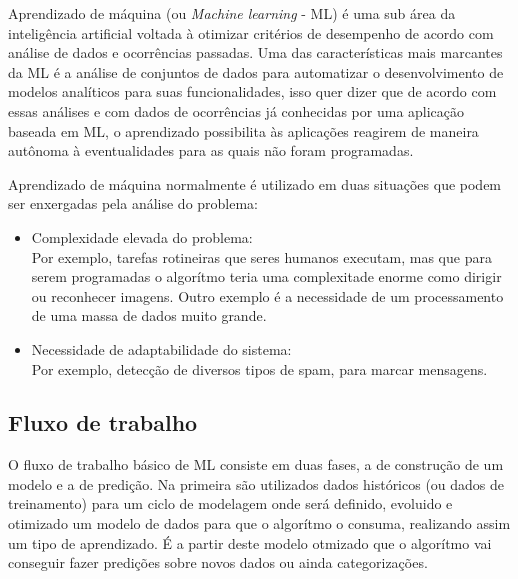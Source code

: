Aprendizado de máquina (ou \textit{Machine learning} - ML) é uma sub área da inteligência artificial voltada à otimizar critérios de desempenho de acordo com análise de dados e ocorrências passadas. \cite{alpaydin2010} Uma das características mais marcantes da ML é a análise de conjuntos de dados para automatizar o desenvolvimento de modelos analíticos para suas funcionalidades, isso quer dizer que de acordo com essas análises e com dados de ocorrências já conhecidas por uma aplicação baseada em ML, o aprendizado possibilita às aplicações reagirem de maneira autônoma à eventualidades para as quais não foram programadas.

Aprendizado de máquina normalmente é utilizado em duas situações que podem ser enxergadas pela análise do problema:

\begin{itemize}
    \item Complexidade elevada do problema: \\ Por exemplo, tarefas rotineiras que seres humanos executam, mas que para serem programadas o algorítmo teria uma complexitade enorme como dirigir ou reconhecer imagens. Outro exemplo é a necessidade de um processamento de uma massa de dados muito grande.
    \item Necessidade de adaptabilidade do sistema: \\ Por exemplo, detecção de diversos tipos de spam, para marcar mensagens. \\ \cite{shalev2014}
\end{itemize}

\subsection{Fluxo de trabalho}
    O fluxo de trabalho básico de ML consiste em duas fases, a de construção de um modelo e a de predição. Na primeira são utilizados dados históricos (ou dados de treinamento) para um ciclo de modelagem onde será definido, evoluido e otimizado um modelo de dados para que o algorítmo o consuma, realizando assim um tipo de aprendizado. É a partir deste modelo otmizado que o algorítmo vai conseguir fazer predições sobre novos dados ou ainda categorizações.

